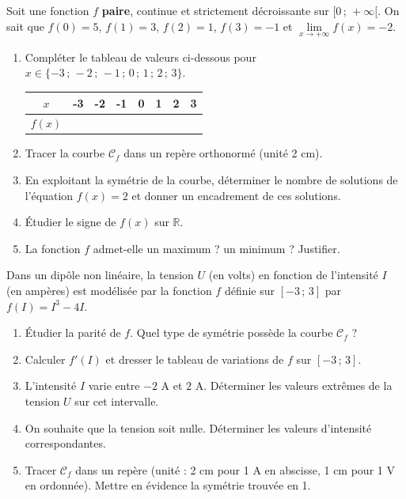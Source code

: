 \documentclass[11pt]{article}
\begin{document}
\begin{exercice}
Soit une fonction $f$ \textbf{paire}, continue et strictement décroissante sur $[0\,;\,+\infty[$. On sait que $f(0)=5$, $f(1)=3$, $f(2)=1$, $f(3)=-1$ et $\lim\limits_{x \to +\infty} f(x) = -2$.
\begin{enumerate}
    \item Compléter le tableau de valeurs ci-dessous pour $x \in \{-3\,;\,-2\,;\,-1\,;\,0\,;\,1\,;\,2\,;\,3\}$.
    \begin{center}
    \begin{tabular}{|c|c|c|c|c|c|c|c|}\hline
    $x$ & -3 & -2 & -1 & 0 & 1 & 2 & 3 \\ \hline
    $f(x)$ & & & & & & & \\ \hline
    \end{tabular}
    \end{center}
    \item Tracer la courbe $\mathcal{C}_f$ dans un repère orthonormé (unité 2 cm).
    \item En exploitant la symétrie de la courbe, déterminer le nombre de solutions de l'équation $f(x)=2$ et donner un encadrement de ces solutions.
    \item Étudier le signe de $f(x)$ sur $\mathbb{R}$.
    \item La fonction $f$ admet-elle un maximum ? un minimum ? Justifier.
\end{enumerate}
\end{exercice}

\begin{exercice}
Dans un dipôle non linéaire, la tension $U$ (en volts) en fonction de l'intensité $I$ (en ampères) est modélisée par la fonction $f$ définie sur $[-3\,;\,3]$ par $f(I) = I^3 - 4I$.
\begin{enumerate}
    \item Étudier la parité de $f$. Quel type de symétrie possède la courbe $\mathcal{C}_f$ ?
    \item Calculer $f'(I)$ et dresser le tableau de variations de $f$ sur $[-3\,;\,3]$.
    \item L'intensité $I$ varie entre $-2$ A et $2$ A. Déterminer les valeurs extrêmes de la tension $U$ sur cet intervalle.
    \item On souhaite que la tension soit nulle. Déterminer les valeurs d'intensité correspondantes.
    \item Tracer $\mathcal{C}_f$ dans un repère (unité : 2 cm pour 1 A en abscisse, 1 cm pour 1 V en ordonnée). Mettre en évidence la symétrie trouvée en 1.
\end{enumerate}
\end{exercice}
\end{document}
